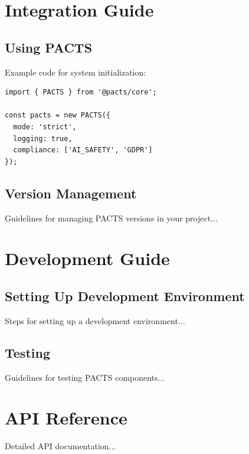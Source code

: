 \documentclass[11pt]{book}
\begin{document}
\chapter{Integration Guide}
\section{Using PACTS}
Example code for system initialization:
\begin{verbatim}
import { PACTS } from '@pacts/core';

const pacts = new PACTS({
  mode: 'strict',
  logging: true,
  compliance: ['AI_SAFETY', 'GDPR']
});
\end{verbatim}

\section{Version Management}
Guidelines for managing PACTS versions in your project...

\chapter{Development Guide}
\section{Setting Up Development Environment}
Steps for setting up a development environment...

\section{Testing}
Guidelines for testing PACTS components...

\chapter{API Reference}
Detailed API documentation...
\end{document}
